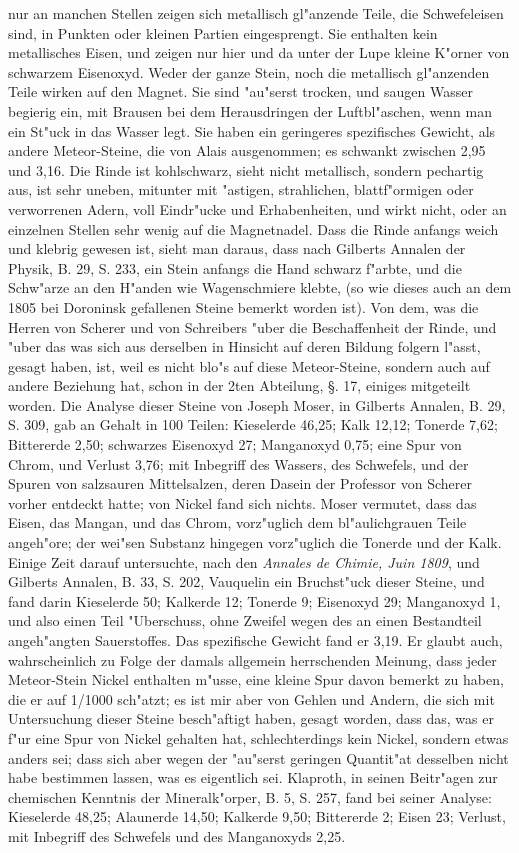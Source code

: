 \documentclass[a4paper, 11pt, oneside, polutonikogreek, german]{article}
\begin{document}
nur an manchen Stellen zeigen sich metallisch gl"anzende Teile, die Schwefeleisen sind, in Punkten oder kleinen Partien eingesprengt. Sie enthalten kein metallisches Eisen, und zeigen nur hier und da unter der Lupe kleine K"orner von schwarzem Eisenoxyd. Weder der ganze Stein, noch die metallisch gl"anzenden Teile wirken auf den Magnet. Sie sind "au"serst trocken, und saugen Wasser begierig ein, mit Brausen bei dem Herausdringen der Luftbl"aschen, wenn man ein St"uck in das Wasser legt. Sie haben ein geringeres spezifisches Gewicht, als andere Meteor-Steine, die von Alais ausgenommen; es schwankt zwischen 2,95 und 3,16. Die Rinde ist kohlschwarz, sieht nicht metallisch, sondern pechartig aus, ist sehr uneben, mitunter mit "astigen, strahlichen, blattf"ormigen oder verworrenen Adern, voll Eindr"ucke und Erhabenheiten, und wirkt nicht, oder an einzelnen Stellen sehr wenig auf die Magnetnadel. Dass die Rinde anfangs weich und klebrig gewesen ist, sieht man daraus, dass nach Gilberts Annalen der Physik, B. 29, S. 233, ein Stein anfangs die Hand schwarz f"arbte, und die Schw"arze an den H"anden wie Wagenschmiere klebte, (so wie dieses auch an dem 1805 bei Doroninsk gefallenen Steine bemerkt worden ist). Von dem, was die Herren von Scherer und von Schreibers "uber die Beschaffenheit der Rinde, und "uber das was sich aus derselben in Hinsicht auf deren Bildung folgern l"asst, gesagt haben, ist, weil es nicht blo"s auf diese Meteor-Steine, sondern auch auf andere Beziehung hat, schon in der 2ten Abteilung, §. 17, einiges mitgeteilt worden. Die Analyse dieser Steine von Joseph Moser, in Gilberts Annalen, B. 29, S. 309, gab an Gehalt in 100 Teilen: Kieselerde 46,25; Kalk 12,12; Tonerde 7,62; Bittererde 2,50; schwarzes Eisenoxyd 27; Manganoxyd 0,75; eine Spur von Chrom, und Verlust 3,76; mit Inbegriff des Wassers, des Schwefels, und der Spuren von salzsauren Mittelsalzen, deren Dasein der Professor von Scherer vorher entdeckt hatte; von Nickel fand sich nichts. Moser vermutet, dass das Eisen, das Mangan, und das Chrom, vorz"uglich dem bl"aulichgrauen Teile angeh"ore; der wei"sen Substanz hingegen vorz"uglich die Tonerde und der Kalk. Einige Zeit darauf untersuchte, nach den \emph{Annales de Chimie, Juin 1809}, und Gilberts Annalen, B. 33, S. 202, Vauquelin ein Bruchst"uck dieser Steine, und fand darin Kieselerde 50; Kalkerde 12; Tonerde 9; Eisenoxyd 29; Manganoxyd 1, und also einen Teil "Uberschuss, ohne Zweifel wegen des an einen Bestandteil angeh"angten Sauerstoffes. Das spezifische Gewicht fand er 3,19. Er glaubt auch, wahrscheinlich zu Folge der damals allgemein herrschenden Meinung, dass jeder Meteor-Stein Nickel enthalten m"usse, eine kleine Spur davon bemerkt zu haben, die er auf 1/1000 sch"atzt; es ist mir aber von Gehlen und Andern, die sich mit Untersuchung dieser Steine besch"aftigt haben, gesagt worden, dass das, was er f"ur eine Spur von Nickel gehalten hat, schlechterdings kein Nickel, sondern etwas anders sei; dass sich aber wegen der "au"serst geringen Quantit"at desselben nicht habe bestimmen lassen, was es eigentlich sei. Klaproth, in seinen Beitr"agen zur chemischen Kenntnis der Mineralk"orper, B. 5, S. 257, fand bei seiner Analyse: Kieselerde 48,25; Alaunerde 14,50; Kalkerde 9,50; Bittererde 2; Eisen 23; Verlust, mit Inbegriff des Schwefels und des Manganoxyds 2,25. 
\end{document}
